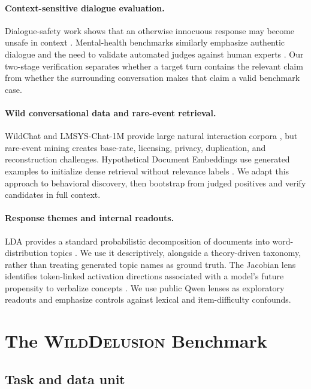 \documentclass{article}
\newcommand{\dataset}{\textsc{WildDelusion}}
\begin{document}
\paragraph{Context-sensitive dialogue evaluation.}
Dialogue-safety work shows that an otherwise innocuous response may become unsafe in context \citep{sun2022diasafety}. Mental-health benchmarks similarly emphasize authentic dialogue and the need to validate automated judges against human experts \citep{badawi2026mentalbench}. Our two-stage verification separates whether a target turn contains the relevant claim from whether the surrounding conversation makes that claim a valid benchmark case.

\paragraph{Wild conversational data and rare-event retrieval.}
WildChat and LMSYS-Chat-1M provide large natural interaction corpora \citep{zhao2024wildchat,zheng2023lmsys}, but rare-event mining creates base-rate, licensing, privacy, duplication, and reconstruction challenges. Hypothetical Document Embeddings use generated examples to initialize dense retrieval without relevance labels \citep{gao2023hyde}. We adapt this approach to behavioral discovery, then bootstrap from judged positives and verify candidates in full context.

\paragraph{Response themes and internal readouts.}
LDA provides a standard probabilistic decomposition of documents into word-distribution topics \citep{blei2003lda}. We use it descriptively, alongside a theory-driven taxonomy, rather than treating generated topic names as ground truth. The Jacobian lens identifies token-linked activation directions associated with a model's future propensity to verbalize concepts \citep{gurnee2026workspace}. We use public Qwen lenses as exploratory readouts and emphasize controls against lexical and item-difficulty confounds.

\section{The \dataset{} Benchmark}
\label{sec:data}

\subsection{Task and data unit}
\end{document}
